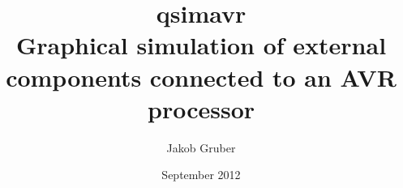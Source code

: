 
\title{qsimavr \\ Graphical simulation of external components connected to an AVR processor}
\author{Jakob Gruber}
\address{Kirschenallee 6/1, A-2120 Obersdorf}
\date{September 2012}


